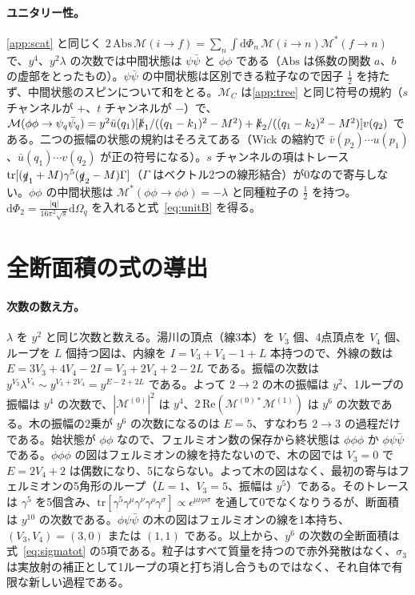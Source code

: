 \documentclass[a4paper,10pt]{ltjsarticle}
\newcommand{\dd}{\mathrm{d}}
\begin{document}
\paragraph{ユニタリー性。}\ref{app:scat} と同じく $2\,\mathrm{Abs}\,\mathcal M(i\to f)=\sum_n\int\dd\Phi_n\,\mathcal M(i\to n)\mathcal M^*(f\to n)$ で、$y^4$、$y^2\lambda$ の次数では中間状態は $\psi\bar\psi$ と $\phi\phi$ である（$\mathrm{Abs}$ は係数の関数 $a$、$b$ の虚部をとったもの）。$\psi\bar\psi$ の中間状態は区別できる粒子なので因子 $\frac12$ を持たず、中間状態のスピンについて和をとる。$\mathcal M_C$ は\ref{app:tree} と同じ符号の規約（$s$ チャンネルが $+$、$t$ チャンネルが $-$）で、$\mathcal M(\phi\phi\to\psi_q\bar\psi_q)=y^2\bar u(q_1)[\slashed k_1/((q_1-k_1)^2-M^2)+\slashed k_2/((q_1-k_2)^2-M^2)]v(q_2)$ である。二つの振幅の状態の規約はそろえてある（Wick の縮約で $\bar v(p_2)\cdots u(p_1)$、$\bar u(q_1)\cdots v(q_2)$ が正の符号になる）。$s$ チャンネルの項はトレース $\mathrm{tr}[(\slashed q_1+M)\gamma^5(\slashed q_2-M)\Gamma]$（$\Gamma$ はベクトル2つの線形結合）が0なので寄与しない。$\phi\phi$ の中間状態は $\mathcal M^*(\phi\phi\to\phi\phi)=-\lambda$ と同種粒子の $\frac12$ を持つ。$\dd\Phi_2=\frac{|\boldsymbol q|}{16\pi^2\sqrt s}\dd\Omega_q$ を入れると式~\eqref{eq:unitB} を得る。

\section{全断面積の式の導出}\label{app:sigmatot}

\paragraph{次数の数え方。}$\lambda$ を $y^2$ と同じ次数と数える。湯川の頂点（線3本）を $V_3$ 個、4点頂点を $V_4$ 個、ループを $L$ 個持つ図は、内線を $I=V_3+V_4-1+L$ 本持つので、外線の数は $E=3V_3+4V_4-2I=V_3+2V_4+2-2L$ である。振幅の次数は $y^{V_3}\lambda^{V_4}\sim y^{V_3+2V_4}=y^{E-2+2L}$ である。よって $2\to2$ の木の振幅は $y^2$、1ループの振幅は $y^4$ の次数で、$|\mathcal M^{(0)}|^2$ は $y^4$、$2\,\mathrm{Re}(\mathcal M^{(0)*}\mathcal M^{(1)})$ は $y^6$ の次数である。木の振幅の2乗が $y^6$ の次数になるのは $E=5$、すなわち $2\to3$ の過程だけである。始状態が $\phi\phi$ なので、フェルミオン数の保存から終状態は $\phi\phi\phi$ か $\phi\psi\bar\psi$ である。$\phi\phi\phi$ の図はフェルミオンの線を持たないので、木の図では $V_3=0$ で $E=2V_4+2$ は偶数になり、5にならない。よって木の図はなく、最初の寄与はフェルミオンの5角形のループ（$L=1$、$V_3=5$、振幅は $y^5$）である。そのトレースは $\gamma^5$ を5個含み、$\mathrm{tr}[\gamma^5\gamma^\mu\gamma^\nu\gamma^\rho\gamma^\sigma]\propto\epsilon^{\mu\nu\rho\sigma}$ を通して0でなくなりうるが、断面積は $y^{10}$ の次数である。$\phi\psi\bar\psi$ の木の図はフェルミオンの線を1本持ち、$(V_3,V_4)=(3,0)$ または $(1,1)$ である。以上から、$y^6$ の次数の全断面積は式~\eqref{eq:sigmatot} の5項である。粒子はすべて質量を持つので赤外発散はなく、$\sigma_3$ は実放射の補正として1ループの項と打ち消し合うものではなく、それ自体で有限な新しい過程である。
\end{document}
